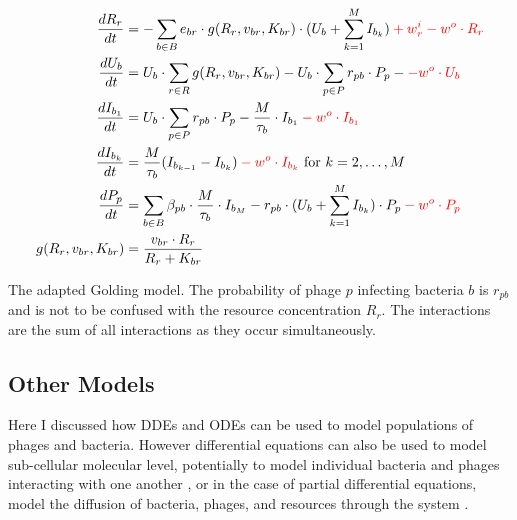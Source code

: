 \begin{eqfloat}
    \begin{align}
        \frac{dR_r}{dt} &= -\sum_{b \in B} e_{b r} \cdot g(R_r, v_{b r}, K_{b r})\cdot (U_b + \sum_{k=1}^{M} I_{b_k}) \mathcolor{red}{+ w^i_r -w^o \cdot R_r}\\
        \frac{dU_b}{dt} &= U_b \cdot \sum_{r \in R} g(R_r, v_{b r}, K_{b r}) - U_b \cdot \sum_{p \in P} r_{p b} \cdot P_p -\mathcolor{red}{-w^o \cdot U_b}\\
        \frac{dI_{b_1}}{dt} &= U_b \cdot \sum_{p \in P}r_{p b} \cdot P_p - \frac{M}{\tau_b}\cdot I_{b_1} \mathcolor{red}{-w^o \cdot I_{b_1}}\\
        \frac{dI_{b_k}}{dt} &= \frac{M}{\tau_b}(I_{b_{k-1}}-I_{b_k}) \mathcolor{red}{-w^o \cdot I_{b_k}}\text{ for } k=2, \dots, M \\
        \frac{dP_p}{dt} &= \sum_{b\in B}\beta_{p b}\cdot\frac{M}{\tau_b} \cdot I_{b_M} - r_{p b}\cdot(U_b + \sum_{k=1}^{M} I_{b_k})\cdot P_p \mathcolor{red}{-w^o \cdot P_p}\\
        g(R_r, v_{b r}, K_{b r}) &= \frac{v_{b r} \cdot R_r}{R_r + K_{b r}}
        \label{eq:adapted_golding_model}
    \end{align} 
    \caption{
        The adapted Golding model. 
        The probability of phage $p$ infecting bacteria $b$ is $r_{p b}$ and is not to be confused with the resource concentration $R_r$. 
        The interactions are the sum of all interactions as they occur simultaneously. 
    }
\end{eqfloat}

\subsection{Other Models}
Here I discussed how DDEs and ODEs can be used to model populations of phages and bacteria. 
However differential equations can also be used to model sub-cellular molecular level, potentially to model individual bacteria and phages interacting with one another \cite{scottInterdependenceCellGrowth2010, mayorgaReconstructionEndosomalOrganization2018}, or in the case of partial differential equations, model the diffusion of bacteria, phages, and resources through the system \cite{kroneSpatialModelsStochastic2004, klannSpatialSimulationsSystems2012}. 
